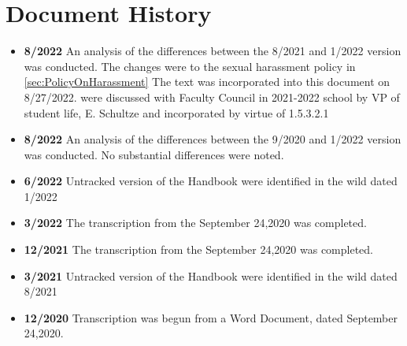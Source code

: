 \section{Document History}
	\begin{itemize}
		\item{{\bfseries 8/2022} An analysis of the differences between the 8/2021 and 1/2022 version was conducted.
			The changes were to the sexual harassment policy in
			\ref{sec:PolicyOnHarassment}
			The text was incorporated into this document on 8/27/2022.
			were discussed with Faculty Council in 2021-2022 school by VP of student life, E. Schultze and incorporated by virtue of 1.5.3.2.1
		}
		\item{{\bfseries 8/2022} An analysis of the differences between the 9/2020 and 1/2022 version was conducted. No substantial differences were noted.}
		\item{{\bfseries 6/2022} Untracked version of the Handbook were identified in the wild dated 1/2022}
		\item{{\bfseries 3/2022} The transcription from the September 24,2020 was completed.}
		\item{{\bfseries 12/2021} The transcription from the September 24,2020 was completed.}
		\item{{\bfseries 3/2021} Untracked version of the Handbook were identified in the wild dated 8/2021}
		\item{{\bfseries 12/2020} Transcription was begun from a Word Document, dated September 24,2020.}
	\end{itemize}